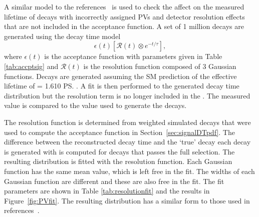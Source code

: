 A similar model to the references~\cite{Aaij:2016ohx,Aaij:2015vza} is used to check the affect on the measured lifetime of decays with incorrectly assigned PVs and detector resolution effects that are not included in the acceptance function. A set of 1 million decays are generated using the decay time model 
\begin{equation}
\epsilon (t) [\mathcal{R}(t) \otimes e^{-t/\tau}],
\end{equation}
where $\epsilon (t)$ is the acceptance function with parameters given in Table \ref{tab:accptsig} and $\mathcal{R}(t)$ is the resolution function composed of 3 Gaussian functions. 
Decays are generated assuming the SM prediction of the \bsmumu effective lifetime of \tmumu = 1.610 \ps. A fit is then performed to the generated decay time distribution but  the resolution term is no longer included in the \pdf. The measured \tmumu value is compared to the value used to generate the decays. 


The resolution function is determined from weighted simulated \bsmumu decays that were used to compute the acceptance function in Section~\ref{sec:signalDTpdf}. The difference between the reconstructed decay time and the `true' decay each decay is generated with is computed for decays that passes the full selection. The resulting distribution is fitted with the resolution function. Each Gaussian function has the same mean value, which is left free in the fit. The widths of each Gaussian function are different and these are also free in the fit. The fit parameters are shown in Table \ref{tab:resolutionfit} and the results in Figure~\ref{fig:PVfit}. %
The resulting distribution has a similar form to those used in references~\cite{Aaij:2016ohx,Aaij:2015vza}. %


